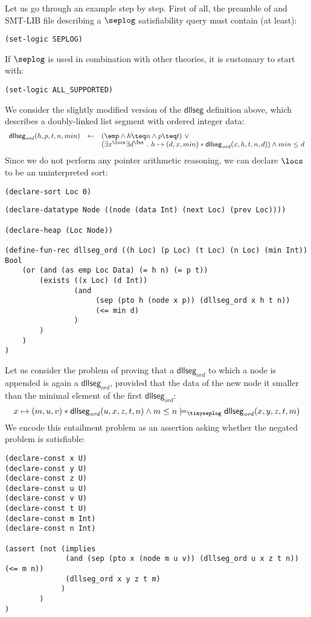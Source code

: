 \documentclass[10pt]{llncs}
\begin{document}
Let us go through an example step by step. First of all, the preamble
of and SMT-LIB file describing a $\seplog$ satisfiability query must
contain (at least): 
\begin{Verbatim}
(set-logic SEPLOG)
\end{Verbatim}
If $\seplog$ is used in combination with other theories, it is
customary to start with:
\begin{Verbatim}
(set-logic ALL_SUPPORTED)
\end{Verbatim}
We consider the slightly modified version of the $\mathsf{dllseg}$
definition above, which describes a doubly-linked list segment with
ordered integer data: 
\[\begin{array}{rcl}
\mathsf{dllseg}_{\mathit{ord}}(h, p, t, n, min) & \leftarrow & (\emp \wedge h \teq n \wedge p \teq t) ~\vee \\
&& (\exists x^{\locs} \exists d^{\Int} ~.~ h \mapsto (d,x,min) * \mathsf{dllseg}_{\mathit{ord}}(x,h,t,n,d)) \wedge min \leq d
\end{array}\]
Since we do not perform any pointer arithmetic reasoning, we can
declare $\locs$ to be an uninterpreted sort: 
\begin{Verbatim}
(declare-sort Loc 0)
\end{Verbatim}
\begin{Verbatim}
(declare-datatype Node ((node (data Int) (next Loc) (prev Loc))))

(declare-heap (Loc Node))

(define-fun-rec dllseg_ord ((h Loc) (p Loc) (t Loc) (n Loc) (min Int)) Bool
    (or (and (as emp Loc Data) (= h n) (= p t))
        (exists ((x Loc) (d Int)) 
                (and 
                     (sep (pto h (node x p)) (dllseg_ord x h t n)) 
                     (<= min d)
                )
        )
    )
)
\end{Verbatim}
Let us consider the problem of proving that a
$\mathsf{dllseg}_{\mathit{ord}}$ to which a node is appended is again
a $\mathsf{dllseg}_{\mathit{ord}}$, provided that the data of the new
node it smaller than the minimal element of the first
$\mathsf{dllseg}_{\mathit{ord}}$:
\[x \mapsto (m,u,v) * \mathsf{dllseg}_{\mathit{ord}}(u,x,z,t,n) \wedge m \leq n
\models_{\tinyseplog} \mathsf{dllseg}_{\mathit{ord}}(x,y,z,t,m)\]
We encode this entailment problem as an assertion asking whether the negated problem is satisfiable:  
\begin{Verbatim}
(declare-const x U)
(declare-const y U)
(declare-const z U)
(declare-const u U)
(declare-const v U)
(declare-const t U)
(declare-const m Int)
(declare-const n Int)

(assert (not (implies 
              (and (sep (pto x (node m u v)) (dllseg_ord u x z t n)) (<= m n)) 
              (dllseg_ord x y z t m)
             )
        )
)
\end{Verbatim}
\end{document}

